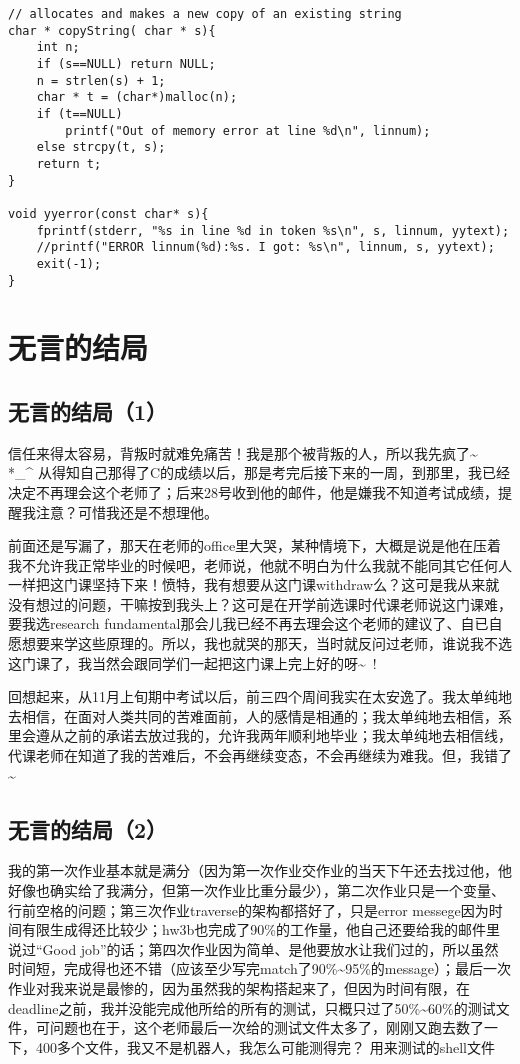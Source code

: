\documentclass[12pt]{book}
\begin{document}
\begin{lstlisting}
// allocates and makes a new copy of an existing string
char * copyString( char * s){
    int n; 
    if (s==NULL) return NULL;
    n = strlen(s) + 1;
    char * t = (char*)malloc(n);
    if (t==NULL)
        printf("Out of memory error at line %d\n", linnum);
    else strcpy(t, s);
    return t;
}

void yyerror(const char* s){
    fprintf(stderr, "%s in line %d in token %s\n", s, linnum, yytext);
    //printf("ERROR linnum(%d):%s. I got: %s\n", linnum, s, yytext);
    exit(-1);
}
\end{lstlisting}

\chapter{无言的结局}
\label{sec-10}
\section{无言的结局（1）}
\label{sec-10-1}

信任来得太容易，背叛时就难免痛苦！我是那个被背叛的人，所以我先疯了\textasciitilde{}~　*\_\^{} 从得知自己那得了C的成绩以后，那是考完后接下来的一周，到那里，我已经决定不再理会这个老师了；后来28号收到他的邮件，他是嫌我不知道考试成绩，提醒我注意？可惜我还是不想理他。

前面还是写漏了，那天在老师的office里大哭，某种情境下，大概是说是他在压着我不允许我正常毕业的时候吧，老师说，他就不明白为什么我就不能同其它任何人一样把这门课坚持下来！愤特，我有想要从这门课withdraw么？这可是我从来就没有想过的问题，干嘛按到我头上？这可是在开学前选课时代课老师说这门课难，要我选research fundamental那会儿我已经不再去理会这个老师的建议了、自已自愿想要来学这些原理的。所以，我也就哭的那天，当时就反问过老师，谁说我不选这门课了，我当然会跟同学们一起把这门课上完上好的呀\textasciitilde{}~!

回想起来，从11月上旬期中考试以后，前三四个周间我实在太安逸了。我太单纯地去相信，在面对人类共同的苦难面前，人的感情是相通的；我太单纯地去相信，系里会遵从之前的承诺去放过我的，允许我两年顺利地毕业；我太单纯地去相信线，代课老师在知道了我的苦难后，不会再继续变态，不会再继续为难我。但，我错了\textasciitilde{}~

\section{无言的结局（2）}
\label{sec-10-2}

我的第一次作业基本就是满分（因为第一次作业交作业的当天下午还去找过他，他好像也确实给了我满分，但第一次作业比重分最少），第二次作业只是一个变量、行前空格的问题；第三次作业traverse的架构都搭好了，只是error messege因为时间有限生成得还比较少；hw3b也完成了90\%的工作量，他自己还要给我的邮件里说过“Good job”的话；第四次作业因为简单、是他要放水让我们过的，所以虽然时间短，完成得也还不错（应该至少写完match了90\%\textasciitilde{}95\%的message）；最后一次作业对我来说是最惨的，因为虽然我的架构搭起来了，但因为时间有限，在deadline之前，我并没能完成他所给的所有的测试，只概只过了50\%\textasciitilde{}60\%的测试文件，可问题也在于，这个老师最后一次给的测试文件太多了，刚刚又跑去数了一下，400多个文件，我又不是机器人，我怎么可能测得完？
用来测试的shell文件
\end{document}

